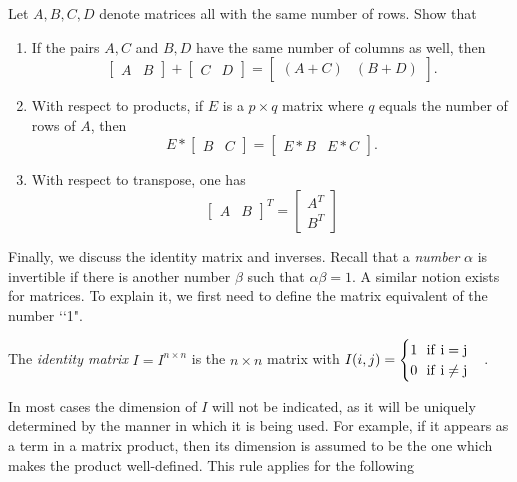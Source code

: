 \documentclass{ximera}
\begin{document}
\begin{exercise} Let $A, B, C, D$ denote matrices all with the same number of rows. Show that
\begin{enumerate}
\item If the pairs $A,C$ and $B,D$ have the same number of columns as well, then
\[
\begin{bmatrix} A & B\end{bmatrix} + \begin{bmatrix} C & D\end{bmatrix} = \begin{bmatrix} (A+C) & (B+D)\end{bmatrix}.
\]
\item With respect to products, if $E$ is a $p\times q$ matrix where $q$ equals the number of rows of $A$, then
\[
E*\begin{bmatrix} B & C\end{bmatrix} = \begin{bmatrix} E*B & E*C\end{bmatrix}.
\]
\item With respect to transpose, one has
\[
\begin{bmatrix} A & B\end{bmatrix}^T = \begin{bmatrix} A^T \\ B^T\end{bmatrix}
\]
\end{enumerate}
\end{exercise}

Finally, we discuss the identity matrix and inverses. Recall that a {\it number} $\alpha$ is invertible if there is another number $\beta$ such that $\alpha\beta = 1$. A similar notion exists for matrices. To explain it, we first need to define the matrix equivalent of the number \lq\lq 1".

\begin{definition} The {\it identity matrix} $I = I^{n\times n}$ is the $n\times n$ matrix with $I(i,j) = \begin{cases}1\ \ \rm{if}\ i=j\\0\ \ \rm{if}\ i\ne j\end{cases}$.
\end{definition}

In most cases the dimension of $I$ will not be indicated, as it will be uniquely determined by the manner in which it is being used. For example, if it appears as a term in a matrix product, then its dimension is assumed to be the one which makes the product well-defined. This rule applies for the following 
\end{document}
